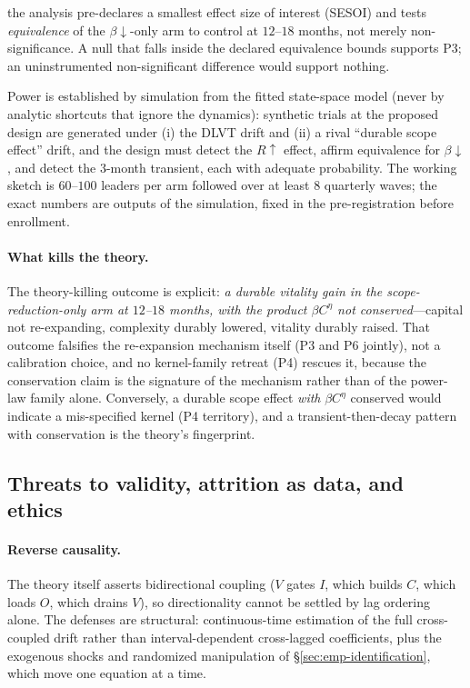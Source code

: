\begin{description}
the analysis pre-declares a smallest effect size of interest (SESOI) and
tests \emph{equivalence} \citep{lakens2017equivalence} of the
$\beta\downarrow$-only arm to control at
$12$--$18$ months, not merely non-significance. A null that falls inside
the declared equivalence bounds supports P3; an uninstrumented
non-significant difference would support nothing.
\item[Power.] Power is established by simulation from the fitted
state-space model (never by analytic shortcuts that ignore the dynamics):
synthetic trials at the proposed design are generated under (i) the DLVT
drift and (ii) a rival ``durable scope effect'' drift, and the design must
detect the $R\uparrow$ effect, affirm equivalence for $\beta\downarrow$,
and detect the $3$-month transient, each with adequate probability. The
working sketch is $60$--$100$ leaders per arm followed over at least $8$
quarterly waves; the exact numbers are outputs of the simulation, fixed
in the pre-registration before enrollment.
\end{description}

\paragraph{What kills the theory.}
The theory-killing outcome is explicit: \emph{a durable vitality gain in
the scope-reduction-only arm at $12$--$18$ months, with the product
$\beta C^{\eta}$ not conserved}---capital not re-expanding, complexity
durably lowered, vitality durably raised. That outcome falsifies the
re-expansion mechanism itself (P3 and P6 jointly), not a calibration
choice, and no kernel-family retreat (P4) rescues it, because the
conservation claim is the signature of the mechanism rather than of the
power-law family alone. Conversely, a durable scope effect \emph{with}
$\beta C^{\eta}$ conserved would indicate a mis-specified kernel (P4
territory), and a transient-then-decay pattern with conservation is the
theory's fingerprint.

\subsection{Threats to validity, attrition as data, and ethics}
\label{sec:emp-threats}

\paragraph{Reverse causality.}
The theory itself asserts bidirectional coupling ($V$ gates $I$, which
builds $C$, which loads $O$, which drains $V$), so directionality cannot be
settled by lag ordering alone. The defenses are structural: continuous-time
estimation of the full cross-coupled drift rather than interval-dependent
cross-lagged coefficients, plus the exogenous shocks and randomized
manipulation of \S\ref{sec:emp-identification}, which move one equation at
a time.

